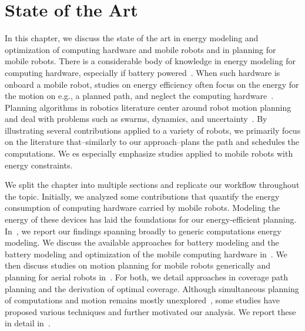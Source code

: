 
\chapter{State of the Art}
\label{cp:soa}

In this chapter, we discuss the state of the art in energy modeling and optimization of computing hardware and mobile robots and in planning for mobile robots. There is a considerable body of knowledge in energy modeling for computing hardware, especially if battery powered~\citep{rao2005battery}. When such hardware is onboard a mobile robot, studies on energy efficiency often focus on the energy for the motion on e.g., a planned path, and neglect the computing hardware~\citep{ondruska2015scheduled}. Planning algorithms in robotics literature center around robot motion planning and deal with problems such as swarms, dynamics, and uncertainty~\citep{lavalle2006planning}. By illustrating several contributions applied to a variety of robots, we primarily focus on the literature that--similarly to our approach--plans the path and schedules the computations. We es especially emphasize studies applied to mobile robots with energy constraints.

We split the chapter into multiple sections and replicate our workflow throughout the topic. Initially, we analyzed some contributions that quantify the energy consumption of computing hardware carried by mobile robots. Modeling the energy of these devices has laid the foundations for our energy-efficient planning. In~, we report our findings spanning broadly to generic computations energy modeling. We discuss the available approaches for battery modeling and the battery modeling and optimization of the mobile computing hardware in~. We then discuss studies on motion planning for mobile robots generically and planning for aerial robots in~. For both, we detail approaches in coverage path planning and the derivation of optimal coverage. Although simultaneous planning of computations and motion remains mostly unexplored~\citep{brateman2006energy,ondruska2015scheduled,sudhakar2020balancing}, some studies have proposed various techniques and further motivated our analysis. We report these in detail in~.

